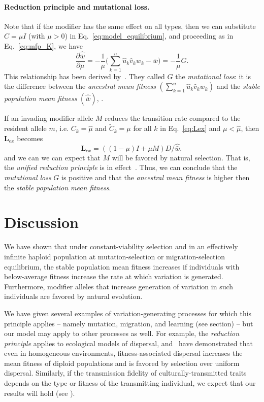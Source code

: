 \documentclass[9pt, a4paper, twocolumn]{extarticle}
\newcommand{\cl}{\mathbf{L}}
\begin{document}
\paragraph*{Reduction principle and mutational loss.}

Note that if the modifier has the same effect on all types,
then we can substitute $C = \mu I$ (with $\mu > 0$) in Eq.~\ref{eq:model_equilibrium}, and proceeding as in Eq.~\ref{eq:mfp_K}, we have
\begin{equation}\label{eq:mutational_loss}
\frac{\partial \hat{\bar{w}}}{\partial \mu} = 
-\frac{1}{\mu}\Big(\sum_{k=1}^{n} \hat u_k \hat v_k w_k - \hat{\bar{w}} \Big) = -\frac{1}{\mu} G.
\end{equation}
This relationship has been derived by~\citet[eq.~24]{Hermisson2002}.
They called $G$ the \emph{mutational loss}: it is the difference between the \emph{ancestral mean fitness} $(\sum_{k=1}^{n} \hat u_k \hat v_k w_k)$ and the \emph{stable population mean fitness} $(\hat{\bar{w}})$, .

If an invading modifier allele $M$ reduces the transition rate compared to the resident allele $m$, i.e. $C_k = \hat \mu$ and $\tilde{C}_k = \mu$ for all $k$ in Eq.~\ref{eq:Lex} and $\mu < \hat \mu$, then $\cl_{ex}$ becomes
\begin{equation}
\cl_{ex} = ((1 - \mu)I + \mu M) D /\hat{\bar w},
\end{equation} 
and we can we can expect that $M$ will be favored by natural selection.
That is, the \emph{unified reduction principle} is in effect~\cite[eqs. 65, 72]{Altenberg2017}.
Thus, we can conclude that the \emph{mutational loss} $G$ is positive and that the \emph{ancestral mean fitness} is higher then the \emph{stable population mean fitness}.


\section*{Discussion}

We have shown that under constant-viability selection and in an effectively infinite haploid population at mutation-selection or migration-selection equilibrium, the stable population mean fitness increases if individuals with below-average fitness increase the rate at which variation is generated. Furthermore, modifier alleles that  increase generation of variation in such individuals are favored by natural evolution.

We have given several examples of variation-generating processes for which this principle applies -- namely mutation, migration, and learning (see \emph{} section) -- but our model may apply to other processes as well.
For example, the \emph{reduction principle} applies to ecological models of dispersal, and~\citet{Gueijman2013} have demonstrated that even in homogeneous environments, fitness-associated dispersal increases the mean fitness of diploid populations and is favored by selection over uniform dispersal.
Similarly, if the transmission fidelity of culturally-transmitted traits depends on the type or fitness of the transmitting individual, we expect that our results will hold (see ).
\end{document}
